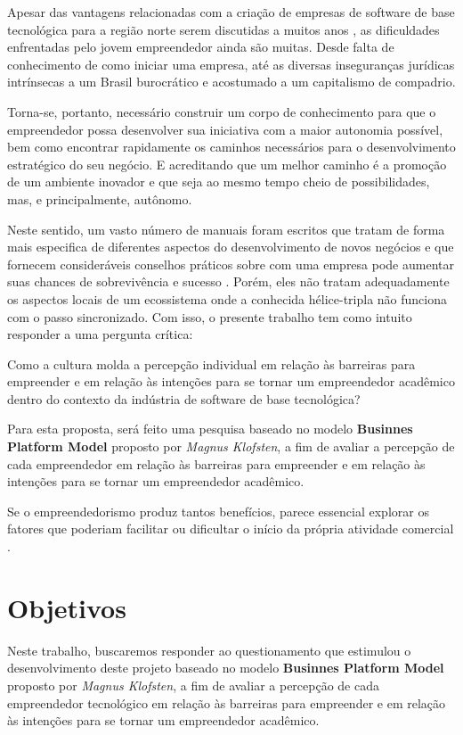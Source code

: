 \documentclass[12pt]{article}
\begin{document}
Apesar das vantagens relacionadas com a criação de empresas de software de base tecnológica para a região norte serem discutidas a muitos anos \cite{bergerman2002}, as dificuldades enfrentadas pelo jovem empreendedor ainda são muitas. Desde falta de conhecimento de como iniciar uma empresa, até as diversas inseguranças jurídicas intrínsecas a um Brasil burocrático e acostumado a um capitalismo de compadrio.

Torna-se, portanto, necessário construir um corpo de conhecimento para que o empreendedor possa desenvolver sua iniciativa com a maior autonomia possível, bem como encontrar rapidamente os caminhos necessários para o desenvolvimento estratégico do seu negócio. E acreditando que um melhor caminho é a promoção de um ambiente inovador e que seja ao mesmo tempo cheio de possibilidades, mas, e principalmente, autônomo. 

Neste sentido, um vasto número de manuais foram escritos que tratam de forma mais especifica de diferentes aspectos do desenvolvimento de novos negócios e que fornecem consideráveis conselhos práticos sobre com uma empresa pode aumentar suas chances de sobrevivência e sucesso \cite{davidsson2003business:2003}. Porém, eles não tratam adequadamente os aspectos locais de um ecossistema onde a conhecida hélice-tripla não funciona com o passo sincronizado. Com isso, o presente trabalho tem como intuito responder a uma pergunta crítica:

Como a cultura molda a percepção individual em relação às barreiras para empreender e em relação às intenções para se tornar um empreendedor acadêmico dentro do contexto da indústria de software de base tecnológica?

Para esta proposta, será feito uma pesquisa baseado no modelo \textbf{Businnes Platform Model} proposto por \textit{Magnus Klofsten}, a fim de avaliar a percepção de cada empreendedor em relação às barreiras para empreender e em relação às intenções para se tornar um empreendedor acadêmico.

Se o empreendedorismo produz tantos benefícios, parece essencial explorar os fatores que poderiam facilitar ou dificultar o início da própria atividade comercial \cite{staniewski2015motivating:2015}.

\section{Objetivos} \label{sec:objec}

Neste trabalho, buscaremos responder ao questionamento que estimulou o desenvolvimento deste projeto  baseado no modelo \textbf{Businnes Platform Model} proposto por \textit{Magnus Klofsten}, a fim de avaliar a percepção de cada empreendedor tecnológico em relação às barreiras para empreender e em relação às intenções para se tornar um empreendedor acadêmico.
\end{document}
